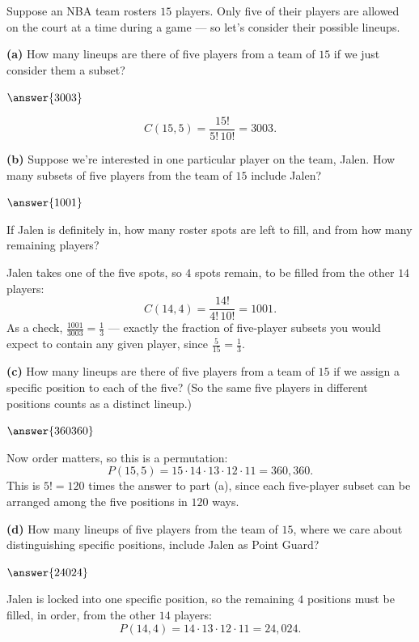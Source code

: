 \documentclass[12pt]{ximera}
\begin{document}
\begin{problem}
Suppose an NBA team rosters $15$ players. Only five of their players are allowed on
the court at a time during a game --- so let's consider their possible lineups.

\begin{prompt}
\textbf{(a)} How many lineups are there of five players from a team of $15$ if we just
consider them a subset?

$\answer{3003}$

\begin{feedback}
\[ C(15,5)=\frac{15!}{5!\,10!}=3003. \]
\end{feedback}
\end{prompt}

\begin{prompt}
\textbf{(b)} Suppose we're interested in one particular player on the team, Jalen. How
many subsets of five players from the team of $15$ include Jalen?

$\answer{1001}$

\begin{hint}
If Jalen is definitely in, how many roster spots are left to fill, and from how many
remaining players?
\end{hint}

\begin{feedback}
Jalen takes one of the five spots, so $4$ spots remain, to be filled from the other
$14$ players:
\[ C(14,4)=\frac{14!}{4!\,10!}=1001. \]
As a check, $\frac{1001}{3003}=\frac13$ --- exactly the fraction of five-player
subsets you would expect to contain any given player, since $\frac{5}{15}=\frac13$.
\end{feedback}
\end{prompt}

\begin{prompt}
\textbf{(c)} How many lineups are there of five players from a team of $15$ if we
assign a specific position to each of the five? (So the same five players in
different positions counts as a distinct lineup.)

$\answer{360360}$

\begin{feedback}
Now order matters, so this is a permutation:
\[ P(15,5)=15\cdot 14\cdot 13\cdot 12\cdot 11 = 360{,}360. \]
This is $5!=120$ times the answer to part (a), since each five-player subset can be
arranged among the five positions in $120$ ways.
\end{feedback}
\end{prompt}

\begin{prompt}
\textbf{(d)} How many lineups of five players from the team of $15$, where we care
about distinguishing specific positions, include Jalen as Point Guard?

$\answer{24024}$

\begin{feedback}
Jalen is locked into one specific position, so the remaining $4$ positions must be
filled, in order, from the other $14$ players:
\[ P(14,4)=14\cdot 13\cdot 12\cdot 11 = 24{,}024. \]
\end{feedback}
\end{prompt}
\end{problem}
\end{document}

